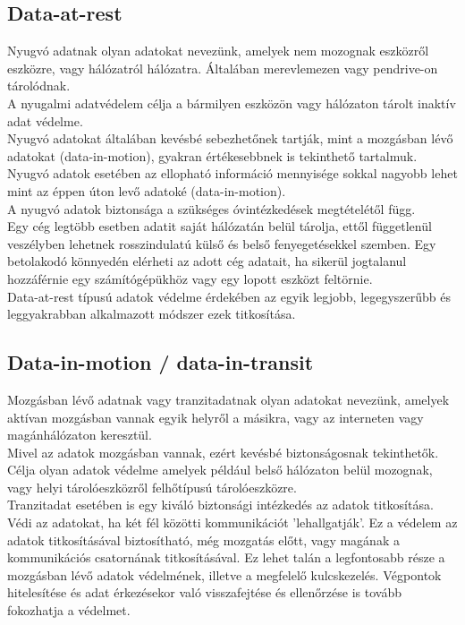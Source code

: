 \subsection{Data-at-rest}
Nyugvó adatnak olyan adatokat nevezünk, amelyek nem mozognak eszközről eszközre, vagy hálózatról hálózatra. Általában merevlemezen vagy pendrive-on tárolódnak.
\vspace{5pt}\\A nyugalmi adatvédelem célja a bármilyen eszközön vagy hálózaton tárolt inaktív adat védelme.
\vspace{5pt}\\Nyugvó adatokat általában kevésbé sebezhetőnek tartják, mint a mozgásban lévő adatokat (data-in-motion), gyakran értékesebbnek is tekinthető tartalmuk. Nyugvó adatok esetében az ellopható információ mennyisége sokkal nagyobb lehet mint az éppen úton levő adatoké (data-in-motion).
\vspace{5pt}\\A nyugvó adatok biztonsága a szükséges óvintézkedések megtételétől függ.
\\Egy cég legtöbb esetben adatit saját hálózatán belül tárolja, ettől függetlenül veszélyben lehetnek rosszindulatú külső és belső fenyegetésekkel szemben. Egy betolakodó könnyedén elérheti az adott cég adatait, ha sikerül jogtalanul hozzáférnie egy számítógépükhöz vagy egy lopott eszközt feltörnie.
\vspace{5pt}\\Data-at-rest típusú adatok védelme érdekében az egyik legjobb, legegyszerűbb és leggyakrabban alkalmazott módszer ezek titkosítása.


\subsection{Data-in-motion / data-in-transit}
Mozgásban lévő adatnak vagy tranzitadatnak olyan adatokat nevezünk, amelyek aktívan mozgásban vannak egyik helyről a másikra, vagy az interneten vagy magánhálózaton keresztül.
\vspace{5pt}\\Mivel az adatok mozgásban vannak, ezért kevésbé biztonságosnak tekinthetők. Célja olyan adatok védelme amelyek például belső hálózaton belül mozognak, vagy helyi tárolóeszközről felhőtípusú tárolóeszközre.
\vspace{5pt}\\Tranzitadat esetében is egy kiváló biztonsági intézkedés az adatok titkosítása. Védi az adatokat, ha két fél közötti kommunikációt ’lehallgatják’.
Ez a védelem az adatok titkosításával biztosítható, még mozgatás előtt, vagy magának a kommunikációs csatornának titkosításával. Ez lehet talán a legfontosabb része a mozgásban lévő adatok védelmének, illetve a megfelelő kulcskezelés. Végpontok hitelesítése és adat érkezésekor való visszafejtése és ellenőrzése is tovább fokozhatja a védelmet. 

